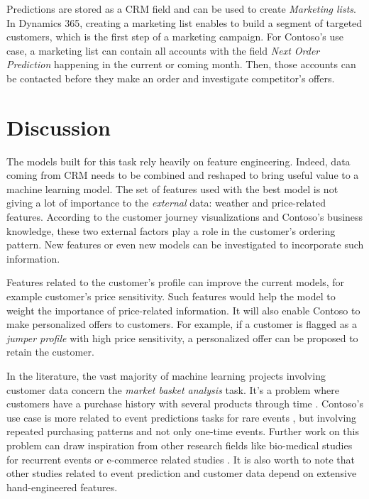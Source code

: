 Predictions are stored as a CRM field and can be used to create \textit{Marketing lists}. In Dynamics 365, creating a marketing list enables to build a segment of targeted customers, which is the first step of a marketing campaign. For Contoso's use case, a marketing list can contain all accounts with the field \textit{Next Order Prediction} happening in the current or coming month. Then, those accounts can be contacted before they make an order and investigate competitor's offers.


\section{Discussion} \label{sec:use-case-further-work}
The models built for this task rely heavily on feature engineering. Indeed, data coming from CRM needs to be combined and reshaped to bring useful value to a machine learning model. The set of features used with the best model is not giving a lot of importance to the \textit{external} data: weather and price-related features. According to the customer journey visualizations and Contoso's business knowledge, these two external factors play a role in the customer's ordering pattern. New features or even new models can be investigated to incorporate such information.

Features related to the customer's profile can improve the current models, for example customer's price sensitivity. Such features would help the model to weight the importance of price-related information. It will also enable Contoso to make personalized offers to customers. For example, if a customer is flagged as a \textit{jumper profile} with high price sensitivity, a personalized offer can be proposed to retain the customer.

In the literature, the vast majority of machine learning projects involving customer data concern the \textit{market basket analysis} task. It's a problem where customers have a purchase history with several products through time \cite{temporal-feature}. Contoso's use case is more related to event predictions tasks for rare events \cite{7953302, Malhotra2015LongST}, but involving repeated purchasing patterns and not only one-time events. Further work on this problem can draw inspiration from other research fields like bio-medical studies for recurrent events \cite{biomedical-recurrent-events} or e-commerce related studies \cite{Liu:2016-repeat-buyer, Tian2015}. It is also worth to note that other studies related to event prediction and customer data depend on extensive hand-engineered features.

